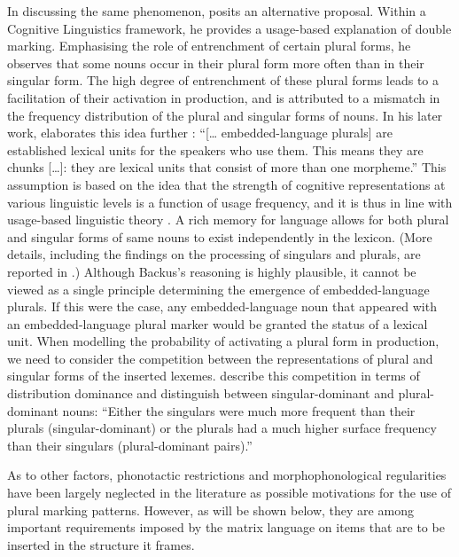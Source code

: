 In discussing the same phenomenon, \citet[151]{backus-two-1996} posits an alternative proposal. Within a Cognitive Linguistics framework, he provides a usage-based explanation of double marking. Emphasising the role of entrenchment of certain plural forms, he observes that some nouns occur in their plural form more often than in their singular form. The high degree of entrenchment of these plural forms leads to a facilitation of their activation in production, and is attributed to a mismatch in the frequency distribution of the plural and singular forms of nouns. In his later work, \citet[98]{backus-evidence-1999} elaborates this idea further : ``[\dots{} embedded-language plurals] are established lexical units for the speakers who use them. This means they are chunks [\dots{}]: they are lexical units that consist of more than one morpheme.'' This assumption is based on the idea that the strength of cognitive representations at various linguistic levels is a function of usage frequency, and it is thus in line with usage-based linguistic theory \citep{bybee-morphology-1985,bybee-repetition-2006,bybee-book-2010}. A rich memory for language \citep{langacker-foundations-1987,langacker00,tomasello-constructing-2003,bybee-book-2010} allows for both plural and singular forms of same nouns to exist independently in the lexicon. (More details, including the findings on the processing of singulars and plurals, are reported in .) Although Backus's reasoning is highly  plausible, it cannot be viewed as a single principle determining the emergence of embedded-language plurals. If this were the case, any embedded-language noun that appeared with an embedded-language plural marker would be granted the status of a lexical unit. When modelling the probability of activating a plural form in production, we need to consider the competition between the representations of plural and singular forms of the inserted lexemes. \citet[][97]{baayen-dijkstra-schreuder} describe this competition in terms of distribution dominance and distinguish between singular-dominant and plural-dominant nouns: “Either the singulars were much more frequent than their plurals (singular-dominant) or the plurals had a much higher surface frequency than their singulars (plural-dominant pairs).”

As to other factors, phonotactic restrictions and morphophonological regularities have been largely neglected in the literature as possible motivations for the use of  plural marking patterns. However, as will be shown below, they are among important requirements imposed by the matrix language on items that are to be inserted in the structure it frames.

